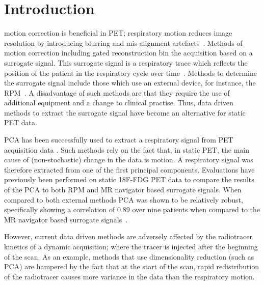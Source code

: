 \section{Introduction} \label{sec:introduction}
     motion correction is beneficial in \gls{PET}; respiratory motion reduces image resolution by introducing blurring and mis-alignment artefacts~\cite{Nehmeh2008a}. Methods of motion correction including gated reconstruction bin the acquisition based on a surrogate signal. This surrogate signal is a respiratory trace which reflects the position of the patient in the respiratory cycle over time~\cite{Kesner2010AMethods, Kesner2013GatingPET}. Methods to determine the surrogate signal include those which use an external device, for instance, the \gls{RPM}~\cite{Bettinardi2013Motion-trackingPET/CT}. A disadvantage of such methods are that they require the use of additional equipment and a change to clinical practise. Thus, data driven methods to extract the surrogate signal have become an alternative for static PET data. %
    
    \gls{PCA} has been successfully used to extract a respiratory signal from \gls{PET} acquisition data \cite{Thielemans2011, Bertolli2018Data-DrivenTomography}. Such methods rely on the fact that, in static \gls{PET}, the main cause of (non-stochastic) change in the data is motion. A respiratory signal was therefore extracted from one of the first principal components. Evaluations have previously been performed on static \gls{18F-FDG} PET data to compare the results of the \gls{PCA} to both \gls{RPM} and \gls{MR} navigator based surrogate signals. When compared to both external methods \gls{PCA} was shown to be relatively robust, specifically showing a correlation of $0.89$ over nine patients when compared to the \gls{MR} navigator based surrogate signals~\cite{Thielemans2013ComparisonData, Manber2015PracticalPET/MR.}.
    
    
    However, current data driven methods are adversely affected by the radiotracer kinetics of a dynamic acquisition; where the tracer is injected after the beginning of the scan. As an example, methods that use dimensionality reduction (such as \gls{PCA}) are hampered by the fact that at the start of the scan, rapid redistribution of the radiotracer causes more variance in the data than the respiratory motion.
    
